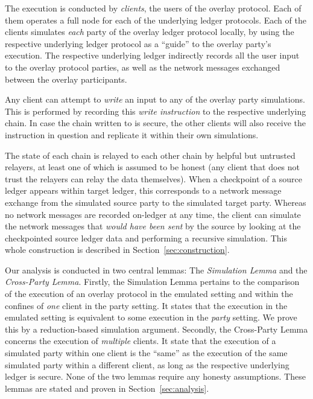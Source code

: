 The execution is conducted by \emph{\rollerblade clients},
the users of the overlay protocol.
Each of them operates a full node for each of the underlying ledger protocols.
Each of the \rollerblade clients simulates \emph{each} party of the overlay
ledger protocol locally, by using the respective underlying ledger protocol
as a ``guide'' to the overlay party's execution.
The respective underlying ledger indirectly records all the
user input to the overlay protocol parties, as well as the network
messages exchanged between the overlay participants.

Any \rollerblade client can attempt to \emph{write} an input to any
of the overlay party simulations. This is performed by recording this
\emph{write instruction} to the respective underlying chain. In case
the chain written to is secure, the other \rollerblade clients will
also receive the instruction in question and replicate it within their
own simulations.

The
state of each chain is relayed to each other chain by helpful but
untrusted relayers, at least one of which is assumed to be honest
(any \rollerblade client that does not trust the relayers can relay
the data themselves). When a checkpoint of a source ledger
appears within target ledger, this corresponds to a network message
exchange from the simulated source party to the simulated target party.
Whereas no network messages are recorded on-ledger at any time,
the \rollerblade client can simulate the network messages that
\emph{would have been sent} by the source by looking at the checkpointed
source ledger data and performing a recursive simulation.
This whole construction is described in Section~\ref{sec:construction}.

Our analysis is conducted in two central lemmas: The \emph{Simulation Lemma}
and the \emph{Cross-Party Lemma}.
Firstly, the Simulation Lemma pertains to the comparison of the execution
of an overlay protocol in the emulated setting and within the confines of
\emph{one} \rollerblade client in the party setting.
It states that the execution in the emulated setting
is equivalent to some execution in the \emph{party} setting.
We prove this by a reduction-based simulation argument.
Secondly, the Cross-Party Lemma concerns the execution of \emph{multiple}
\rollerblade clients. It state that the execution of a simulated party
within one \rollerblade client is the ``same'' as the execution of the
same simulated party within a different \rollerblade client, as long
as the respective underlying ledger is secure.
None of the two lemmas require any honesty assumptions.
These lemmas are stated and proven in Section~\ref{sec:analysis}.

